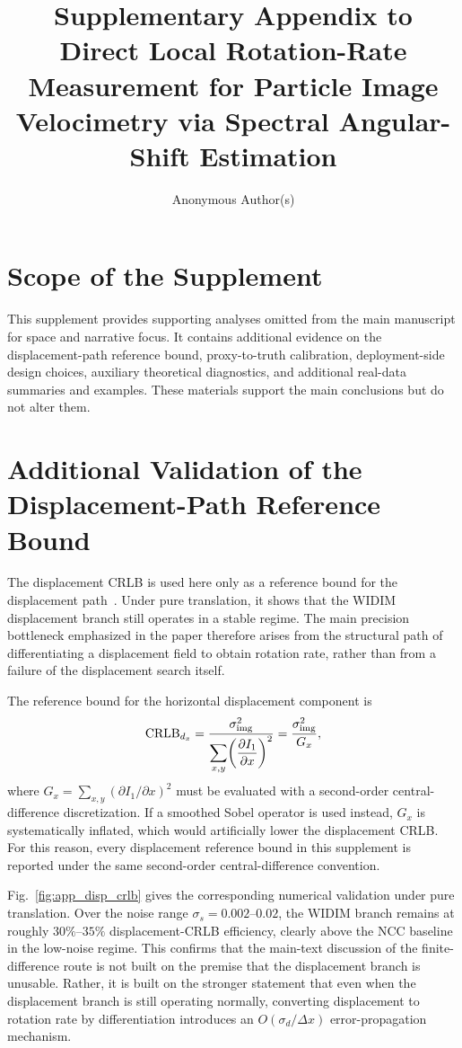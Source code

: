 \documentclass[lettersize,journal,onecolumn]{IEEEtran}
\title{Supplementary Appendix to\\
Direct Local Rotation-Rate Measurement for Particle Image Velocimetry via Spectral Angular-Shift Estimation}
\author{Anonymous Author(s)}
\newcommand{\CRLB}{\mathrm{CRLB}}
\begin{document}
\maketitle

\section{Scope of the Supplement}

This supplement provides supporting analyses omitted from the main manuscript for space and narrative focus.
It contains additional evidence on the displacement-path reference bound,
proxy-to-truth calibration, deployment-side design choices, auxiliary theoretical diagnostics,
and additional real-data summaries and examples.
These materials support the main conclusions but do not alter them.

\section{Additional Validation of the Displacement-Path Reference Bound}
\label{app:disp}

The displacement CRLB is used here only as a reference bound for the
displacement path~\cite{Westerweel1997}.
Under pure translation, it shows that the WIDIM displacement branch still
operates in a stable regime.
The main precision bottleneck emphasized in the paper therefore arises from the
structural path of differentiating a displacement field to obtain rotation rate,
rather than from a failure of the displacement search itself.

The reference bound for the horizontal displacement component is
\begin{equation}
  \CRLB_{d_x}
  = \frac{\sigma_{\rm img}^2}{\displaystyle\sum_{x,y}\!\left(\frac{\partial I_1}{\partial x}\right)^2}
  = \frac{\sigma_{\rm img}^2}{G_x},
  \label{eq:app_crlb_disp}
\end{equation}
where $G_x=\sum_{x,y}(\partial I_1/\partial x)^2$ must be evaluated with a
second-order central-difference discretization.
If a smoothed Sobel operator is used instead,
$G_x$ is systematically inflated,
which would artificially lower the displacement CRLB.
For this reason, every displacement reference bound in this supplement is
reported under the same second-order central-difference convention.

Fig.~\ref{fig:app_disp_crlb} gives the corresponding numerical validation under
pure translation.
Over the noise range $\sigma_s=0.002$--$0.02$,
the WIDIM branch remains at roughly $30\%$--$35\%$
displacement-CRLB efficiency,
clearly above the NCC baseline in the low-noise regime.
This confirms that the main-text discussion of the finite-difference route is
not built on the premise that the displacement branch is unusable.
Rather, it is built on the stronger statement that even when the displacement
branch is still operating normally, converting displacement to rotation rate by
differentiation introduces an $O(\sigma_d/\Delta x)$ error-propagation mechanism.
\end{document}
